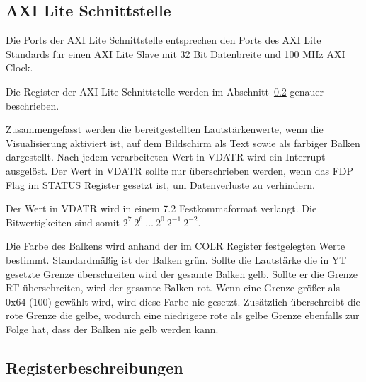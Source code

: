 \subsection{AXI Lite Schnittstelle}

Die Ports der AXI Lite Schnittstelle entsprechen den Ports des AXI Lite Standards für einen AXI Lite Slave mit 32 Bit Datenbreite und 100 MHz AXI Clock.

Die Register der AXI Lite Schnittstelle werden im Abschnitt~\ref{subsec:visual_register} genauer beschrieben.

Zusammengefasst werden die bereitgestellten Lautstärkenwerte, wenn die Visualisierung aktiviert ist, auf dem Bildschirm als Text sowie als farbiger Balken dargestellt.
Nach jedem verarbeiteten Wert in VDATR wird ein Interrupt ausgelöst.
Der Wert in VDATR sollte nur überschrieben werden, wenn das FDP Flag im STATUS Register gesetzt ist, um Datenverluste zu verhindern.

Der Wert in VDATR wird in einem 7.2 Festkommaformat verlangt.
Die Bitwertigkeiten sind somit $2^7 \ 2^6 \ \dots \ 2^0 \ 2^{-1} \ 2^{-2}$.

Die Farbe des Balkens wird anhand der im COLR Register festgelegten Werte bestimmt.
Standardmäßig ist der Balken grün.
Sollte die Lautstärke die in YT gesetzte Grenze überschreiten wird der gesamte Balken gelb.
Sollte er die Grenze RT überschreiten, wird der gesamte Balken rot.
Wenn eine Grenze größer als 0x64 (100) gewählt wird, wird diese Farbe nie gesetzt.
Zusätzlich überschreibt die rote Grenze die gelbe, wodurch eine niedrigere rote als gelbe Grenze ebenfalls zur Folge hat, dass der Balken nie gelb werden kann.

\subsection{Registerbeschreibungen}\label{subsec:visual_register}

